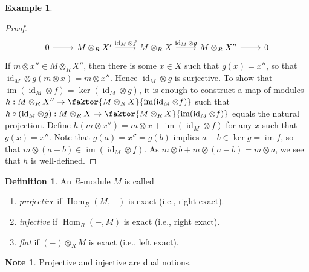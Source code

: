 \documentclass[10pt,letterpaper,cm]{nupset}
\theoremstyle{definition}
\newtheorem*{definition}{Definition}
\newtheorem{exmp}{Example}
\newtheorem{note}{Note}
\newcommand{\1}{\mathbf{1}}
\newcommand{\0}{\vec 0}
\DeclareMathOperator{\id}{id}
\DeclareMathOperator{\im}{im}
\DeclareMathOperator{\Hom}{Hom}
\begin{document}
\begin{exmp}
\begin{enumerate}
\begin{proof}
\[
\begin{tikzcd}
0 \arrow[r] & M\otimes_R X' \arrow[r, "\id_M \otimes f"] & M\otimes_R X \arrow[r, "\id_M \otimes g"] & M\otimes_R X'' \arrow[r] & 0
\end{tikzcd}
\]
If $ m \otimes x'' \in M \otimes_R X''$, then there is some $x \in X$ such that $g(x) = x''$, so that $\id_M \otimes g(m \otimes x) = m\otimes x''$. Hence $\id_M \otimes g$ is surjective. To show that $\im(\id_M \otimes f) = \ker (\id_M \otimes g)$, it is enough to construct a map of modules $h: M \otimes_R X'' \to \faktor{M \otimes_R X}{\im(\id_M \otimes f)}$ such that $h\circ (\id_M \otimes g) : M\otimes_R X \to \faktor{M \otimes_R X}{\im(\id_M \otimes f)}$ equals the natural projection. Define $h(m\otimes x'') = m \otimes x + \im(\id_M \otimes f)$ for any $x$ such that $g(x) = x''$. Note that $g(a) = x'' = g(b)$ implies $a-b \in \ker g = \im f$, so that $m \otimes (a-b) \in \im(\id_M \otimes f)$. As $m\otimes b + m \otimes (a-b) = m\otimes a$, we see that $h$ is well-defined.
\end{proof}
\end{enumerate}
\end{exmp}

\begin{definition} An $R$-module $M$ is called
\begin{enumerate}
\item \textit{projective} if $\Hom_R(M, -)$ is exact (i.e., right exact).
\item \textit{injective} if $\Hom_R(-, M)$ is exact (i.e., right exact).
\item \textit{flat} if $(-) \otimes_R M$ is exact (i.e., left exact).
\end{enumerate}
\end{definition}

\begin{note}
Projective and injective are dual notions.
\end{note}
\end{document}
